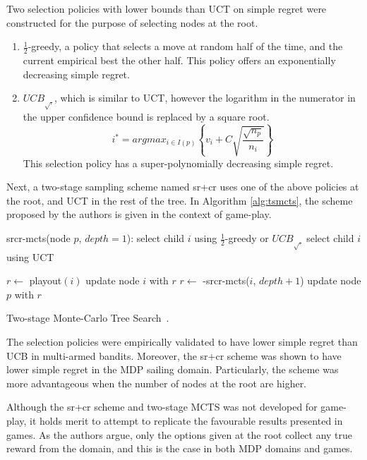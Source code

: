 \documentclass{kecsmstr}
\newcommand{\func}[1]{{\sc #1}}
\begin{document}
Two selection policies with lower bounds than UCT on simple regret were constructed for the purpose of selecting nodes at the root.
\begin{enumerate}
\item $\frac{1}{2}$-greedy, a policy that selects a move at random half of the time, and the current empirical best the other half. This policy offers an exponentially decreasing simple regret.
\item ${UCB}_{\sqrt{.}}$, which is similar to UCT, however the logarithm in the numerator in the upper confidence bound is replaced by a square root.
\begin{equation}
\label{eq:uctsqrt}
i^* = argmax_{i \in I(p)}\left\{ v_i + C \sqrt{ \frac{\sqrt{n_p}}{n_i}}\right\}
\end{equation}
This selection policy has a super-polynomially decreasing simple regret.
\end{enumerate}

Next, a two-stage sampling scheme named {\sc sr+cr} uses one of the above policies at the root, and UCT in the rest of the tree. In Algorithm \ref{alg:tsmcts}, the scheme proposed by the authors is given in the context of game-play.
\IncMargin{1em}
\begin{algorithm2e}[ht]
	\func{srcr-mcts}(node $p$, $depth = 1$):														\;
	\Indp							
	 {
	select child $i$ using $\frac{1}{2}$-greedy or ${UCB}_{\sqrt{.}}$								\;
	}
	{
	select child $i$ using UCT 																		\;
	}

     {
    	$r \gets$ {\sc playout}$(i)$ 																\;
    	\func{update} node $i$ with $r$																\;
    }
    {
    	$r \gets$ -\func{srcr-mcts}($i$, $depth + 1$)												\;
    }	
    \func{update} node $p$ with $r$																	\;
	\Indm
  \caption[Two-stage Monte-Carlo Tree Search]{Two-stage Monte-Carlo Tree Search~\protect{}. \label{alg:tsmcts}}
\end{algorithm2e}
\DecMargin{1em}

The selection policies were empirically validated to have lower simple regret than UCB in multi-armed bandits. Moreover, the {\sc sr+cr} scheme was shown to have lower simple regret in the MDP sailing domain. Particularly, the scheme was more advantageous when the number of nodes at the root are higher.

Although the {\sc sr+cr} scheme and two-stage MCTS was not developed for game-play, it holds merit to attempt to replicate the favourable results presented in games. As the authors argue, only the options given at the root collect any true reward from the domain, and this is the case in both MDP domains and games.
\newpage
\end{document}
